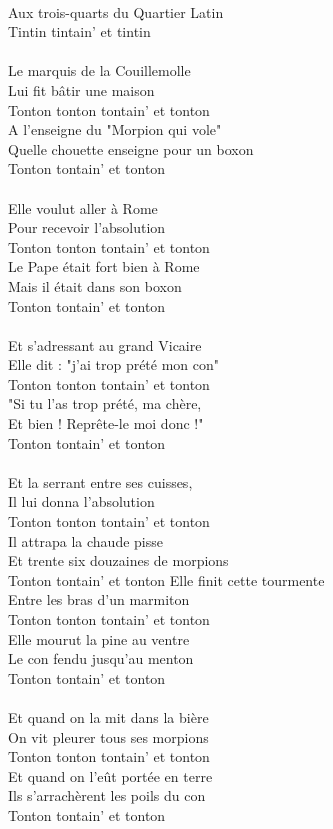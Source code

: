 \\Aux trois-quarts du Quartier Latin
\\Tintin tintain' et tintin
\\\\Le marquis de la Couillemolle
\\Lui fit bâtir une maison
\\Tonton tonton tontain' et tonton
\\A l'enseigne du "Morpion qui vole"
\\Quelle chouette enseigne pour un boxon
\\Tonton tontain' et tonton
\\\\Elle voulut aller à Rome
\\Pour recevoir l'absolution
\\Tonton tonton tontain' et tonton
\\Le Pape était fort bien à Rome
\\Mais il était dans son boxon
\\Tonton tontain' et tonton
\\\\Et s'adressant au grand Vicaire
\\Elle dit : "j'ai trop prété mon con"
\\Tonton tonton tontain' et tonton
\\"Si tu l'as trop prété, ma chère,
\\Et bien ! Reprête-le moi donc !"
\\Tonton tontain' et tonton
\\\\Et la serrant entre ses cuisses,
\\Il lui donna l'absolution
\\Tonton tonton tontain' et tonton
\\Il attrapa la chaude pisse
\\Et trente six douzaines de morpions
\\Tonton tontain' et tonton
\breakpage
Elle finit cette tourmente
\\Entre les bras d'un marmiton
\\Tonton tonton tontain' et tonton
\\Elle mourut la pine au ventre
\\Le con fendu jusqu'au menton
\\Tonton tontain' et tonton
\\\\Et quand on la mit dans la bière
\\On vit pleurer tous ses morpions
\\Tonton tonton tontain' et tonton
\\Et quand on l'eût portée en terre
\\Ils s'arrachèrent les poils du con
\\Tonton tontain' et tonton
\\


